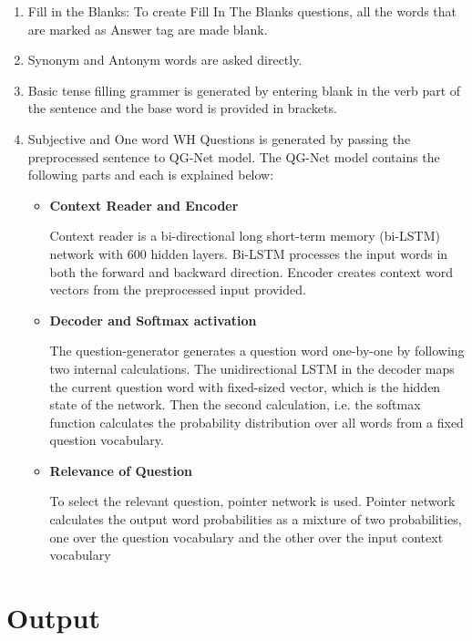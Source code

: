 \begin{enumerate}

\item Fill in the Blanks: To create Fill In The Blanks questions, all the words that
are marked as Answer tag are made blank.

\item Synonym and Antonym words are asked directly.
\item Basic tense filling grammer is generated by entering blank in the verb part of
the sentence and the base word is provided in brackets.

\item Subjective and One word WH Questions is generated by passing the preprocessed
sentence to QG-Net model. The QG-Net model contains the following parts and each
is explained below:

\begin{itemize}

	\item \textbf{Context Reader and Encoder}

Context reader is a bi-directional long short-term memory (bi-LSTM) network with
		600 hidden layers. Bi-LSTM processes the input words in both the
		forward and backward direction. Encoder creates context word
		vectors from the preprocessed input provided.

\item \textbf{Decoder and Softmax activation}

	The question-generator generates a question word one-by-one by following
		two internal calculations. The unidirectional LSTM in the
		decoder maps the current question word with fixed-sized vector,
		which is the hidden state of the network. Then the second
		calculation, i.e. the softmax function calculates the
		probability distribution over all words from a fixed question
		vocabulary.

\item \textbf{Relevance of Question}

	To select the relevant question, pointer network is used. Pointer
		network calculates the output word probabilities as a mixture of
		two probabilities, one over the question vocabulary and the
		other over the input context vocabulary

\end{itemize}

\end{enumerate}

\section{Output}

